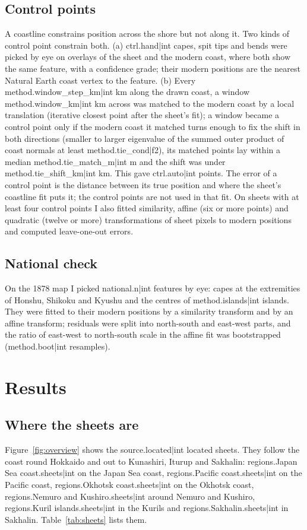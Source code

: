 \documentclass[11pt,a4paper]{article}
\begin{document}
\subsection{Control points}
A coastline constrains position across the shore but not along it. Two kinds of control point constrain both. (a) {{ctrl.hand|int}} capes, spit tips and bends were picked by eye on overlays of the sheet and the modern coast, where both show the same feature, with a confidence grade; their modern positions are the nearest Natural Earth coast vertex to the feature. (b) Every {{method.window_step_km|int}} km along the drawn coast, a window {{method.window_km|int}} km across was matched to the modern coast by a local translation (iterative closest point after the sheet's fit); a window became a control point only if the modern coast it matched turns enough to fix the shift in both directions (smaller to larger eigenvalue of the summed outer product of coast normals at least {{method.tie_cond|f2}}), its matched points lay within a median {{method.tie_match_m|int}} m and the shift was under {{method.tie_shift_km|int}} km. This gave {{ctrl.auto|int}} points. The error of a control point is the distance between its true position and where the sheet's coastline fit puts it; the control points are not used in that fit. On sheets with at least four control points I also fitted similarity, affine (six or more points) and quadratic (twelve or more) transformations of sheet pixels to modern positions and computed leave-one-out errors.

\subsection{National check}
On the 1878 map I picked {{national.n|int}} features by eye: capes at the extremities of Honshu, Shikoku and Kyushu and the centres of {{method.islands|int}} islands. They were fitted to their modern positions by a similarity transform and by an affine transform; residuals were split into north-south and east-west parts, and the ratio of east-west to north-south scale in the affine fit was bootstrapped ({{method.boot|int}} resamples).

\section{Results}
\subsection{Where the sheets are}
Figure~\ref{fig:overview} shows the {{source.located|int}} located sheets. They follow the coast round Hokkaido and out to Kunashiri, Iturup and Sakhalin: {{regions.Japan Sea coast.sheets|int}} on the Japan Sea coast, {{regions.Pacific coast.sheets|int}} on the Pacific coast, {{regions.Okhotsk coast.sheets|int}} on the Okhotsk coast, {{regions.Nemuro and Kushiro.sheets|int}} around Nemuro and Kushiro, {{regions.Kuril islands.sheets|int}} in the Kurils and {{regions.Sakhalin.sheets|int}} in Sakhalin. Table~\ref{tab:sheets} lists them.
\end{document}

